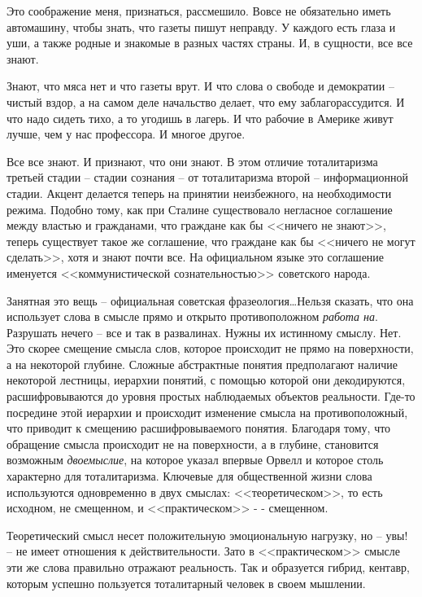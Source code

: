 \documentclass{book}
\begin{document}
Это соображение меня, признаться, рассмешило. Вовсе не обязательно иметь автомашину, чтобы знать, что газеты пишут неправду. У каждого есть глаза и уши, а также родные и знакомые в разных частях страны. И, в сущности, все все знают.

Знают, что мяса нет и что газеты врут. И что слова о свободе и демократии -- чистый вздор, а на самом деле начальство делает, что ему заблагорассудится. И что надо сидеть тихо, а то угодишь в лагерь. И что рабочие в Америке живут лучше, чем у нас профессора. И многое другое.

Все все знают. И признают, что они знают. В этом отличие тоталитаризма третьей стадии -- стадии сознания -- от тоталитаризма второй -- информационной стадии. Акцент делается теперь на принятии неизбежного, на необходимости режима. Подобно тому, как при Сталине существовало негласное соглашение между властью и гражданами, что граждане как бы <<ничего не знают>>, теперь существует такое же соглашение, что граждане как бы <<ничего не могут сделать>>, хотя и знают почти все. На официальном языке это соглашение именуется <<комму­нистической сознательностью>> советского народа.

Занятная это вещь -- официальная советская фразеология\ldots Нельзя сказать, что она использует слова в смысле прямо и открыто противоположном \textit{работа на}.  Разрушать нечего -- все и так в развалинах. Нужны их истинному смыслу. Нет. Это скорее смещение смысла слов, которое происходит не прямо на поверхности, а на некоторой глубине. Сложные абстракт­ные понятия предполагают наличие некоторой лестницы, ие­рархии понятий, с помощью которой они декодируются, рас­шифровываются до уровня простых наблюдаемых объектов реальности. Где-то посредине этой иерархии и происходит изме­нение смысла на противоположный, что приводит к смещению расшифровываемого понятия. Благодаря тому, что обращение смысла происходит не на поверхности, а в глубине, становит­ся возможным \textit{двоемыслие},  на которое указал впервые Орвелл и которое столь характерно для тоталитаризма. Ключе­вые для общественной жизни слова используются одновре­менно в двух смыслах: <<теоретическом>>, то есть исходном, не смещенном, и <<практическом>> -
- смещенном. 

Теоретиче­ский смысл несет положительную эмоциональную нагрузку, но -- увы! -- не имеет отношения к действительности. Зато в <<практическом>> смысле эти же слова правильно отражают реальность. Так и образуется гибрид, кентавр, которым успеш­но пользуется тоталитарный человек в своем мышлении.
\end{document}
